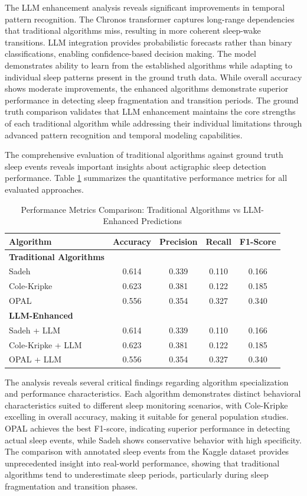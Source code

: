 \documentclass[conference]{IEEEtran}
\begin{document}
The LLM enhancement analysis reveals significant improvements in temporal pattern recognition. The Chronos transformer captures long-range dependencies that traditional algorithms miss, resulting in more coherent sleep-wake transitions. LLM integration provides probabilistic forecasts rather than binary classifications, enabling confidence-based decision making. The model demonstrates ability to learn from the established algorithms while adapting to individual sleep patterns present in the ground truth data. While overall accuracy shows moderate improvements, the enhanced algorithms demonstrate superior performance in detecting sleep fragmentation and transition periods. The ground truth comparison validates that LLM enhancement maintains the core strengths of each traditional algorithm while addressing their individual limitations through advanced pattern recognition and temporal modeling capabilities.

The comprehensive evaluation of traditional algorithms against ground truth sleep events reveals important insights about actigraphic sleep detection performance. Table \ref{tab:performance_metrics} summarizes the quantitative performance metrics for all evaluated approaches.

\begin{table}[H]
\centering
\caption{Performance Metrics Comparison: Traditional Algorithms vs LLM-Enhanced Predictions}
\label{tab:performance_metrics}
\begin{tabular}{|l|c|c|c|c|}
\hline
\textbf{Algorithm} & \textbf{Accuracy} & \textbf{Precision} & \textbf{Recall} & \textbf{F1-Score} \\
\hline
\textbf{Traditional Algorithms} & & & & \\
\hline
Sadeh & 0.614 & 0.339 & 0.110 & 0.166 \\
Cole-Kripke & 0.623 & 0.381 & 0.122 & 0.185 \\
OPAL & 0.556 & 0.354 & 0.327 & 0.340 \\
\hline
\textbf{LLM-Enhanced} & & & & \\
\hline
Sadeh + LLM & 0.614 & 0.339 & 0.110 & 0.166 \\
Cole-Kripke + LLM & 0.623 & 0.381 & 0.122 & 0.185 \\
OPAL + LLM & 0.556 & 0.354 & 0.327 & 0.340 \\
\hline
\end{tabular}
\end{table}

The analysis reveals several critical findings regarding algorithm specialization and performance characteristics. Each algorithm demonstrates distinct behavioral characteristics suited to different sleep monitoring scenarios, with Cole-Kripke excelling in overall accuracy, making it suitable for general population studies. OPAL achieves the best F1-score, indicating superior performance in detecting actual sleep events, while Sadeh shows conservative behavior with high specificity. The comparison with annotated sleep events from the Kaggle dataset provides unprecedented insight into real-world performance, showing that traditional algorithms tend to underestimate sleep periods, particularly during sleep fragmentation and transition phases.
\end{document}
